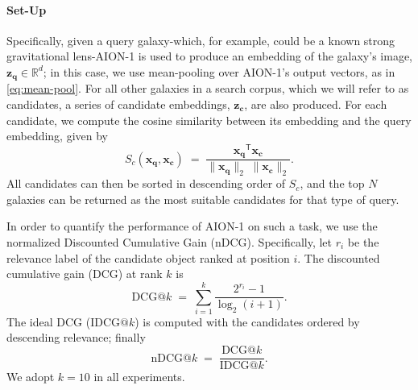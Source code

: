 \documentclass[]{polymathic}
\begin{document}
\paragraph{Set-Up} Specifically, given a query galaxy-which, for example, could be a known strong gravitational lens-AION-1 is used to produce an embedding of the galaxy's image, $\mathbf{z_q} \!\in\! \mathbb{R}^{d}$; in this case, we use mean-pooling over AION-1's output vectors, as in \autoref{eq:mean-pool}. For all other galaxies in a search corpus, which we will refer to as candidates, a series of candidate embeddings, $\mathbf{z_c}$, are also produced. For each candidate, we compute the cosine similarity between its embedding and the query embedding, given by
\begin{equation}
\label{eq:cosine-similarity}
S_c(\mathbf{x_q}, \mathbf{x_c}) \;=\;
\frac{\mathbf{x_q}^{\mathsf T}\mathbf{x_c}}
     {\|\mathbf{x_q}\|_2\;\|\mathbf{x_c}\|_2}.
\end{equation}
All candidates can then be sorted in descending order of $S_c$, and the top $N$ galaxies can be returned as the most suitable candidates for that type of query. 

In order to quantify the performance of AION-1 on such a task, we use the normalized Discounted Cumulative Gain (nDCG). Specifically, let $r_i$ be the relevance label of the candidate object ranked at position $i$.  The discounted cumulative gain (DCG) at rank $k$ is
\begin{equation}
\mathrm{DCG@}k \;=\;
\sum_{i=1}^{k} \frac{2^{r_i}-1}{\log_2(i+1)}.\label{eq:dcg}
\end{equation}
The ideal DCG ($\mathrm{IDCG@}k$) is computed with the candidates ordered by descending relevance; finally
\[
\mathrm{nDCG@}k \;=\; \frac{\mathrm{DCG@}k}{\mathrm{IDCG@}k}.
\]
We adopt $k=10$ in all experiments.
\end{document}
